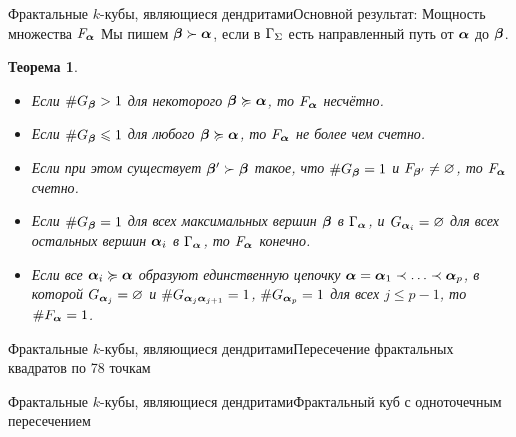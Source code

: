 \documentclass[aspectratio=1610, 10pt, notheorems]{beamer}
\newtheorem{theorem}     {Теорема}
\newtheorem{lemma}       {Лемма}
\begin{document}
\begin{frame}{Фрактальные $k$-кубы, являющиеся дендритами}{Основной результат: Мощность множества $F_{\bm{\alpha}}$}
Мы пишем ${\bm{\beta}}\succ{\bm{\alpha}}$, если в $\Gamma_\Sigma$ есть направленный путь от ${\bm{\alpha}}$ до ${\bm{\beta}}$.
\begin{theorem}
\begin{itemize} %
\item[(1)] Если $\#G_{\bm{\beta}}>1$ для некоторого ${\bm{\beta}}\succcurlyeq{\bm{\alpha}}$, то  $F_{\bm{\alpha}}$ несчётно.

\item[(2a)] Если  $\#G_{\bm{\beta}}\leqslant1$ для любого ${\bm{\beta}}\succcurlyeq{\bm{\alpha}}$, то  $F_{\bm{\alpha}}$ не более чем счетно.

\item[(2b)] Если при этом существует ${\bm{\beta}}'\succ{\bm{\beta}}$ такое, что $\#G_{\bm{\beta}}=1$ и $F_{{\bm{\beta}}'}\neq\varnothing$, то $F_{\bm{\alpha}}$ счетно.

\item[(3)] Если  $\#G_{\bm{\beta}}=1$ для всех максимальных вершин ${\bm{\beta}}$ в $\Gamma_{\bm{\alpha}}$, и $G_{{\bm{\alpha}}_i}=\varnothing$ для всех остальных вершин ${\bm{\alpha}}_i$ в $\Gamma_{\bm{\alpha}}$, то $F_{\bm{\alpha}}$ конечно.

\item[(4)] Если все ${\bm{\alpha}}_i\succcurlyeq{\bm{\alpha}}$ образуют единственную цепочку ${\bm{\alpha}}={\bm{\alpha}}_1\prec\ldots\prec{\bm{\alpha}}_p$, в которой $G_{{\bm{\alpha}}_j}=\varnothing$ и $\# G_{{\bm{\alpha}}_j{\bm{\alpha}}_{j+1}}=1$, $\#G_{{\bm{\alpha}}_p}=1$ для всех $j\le p-1$, то $\#F_{\bm{\alpha}}=1$.
\end{itemize}
\end{theorem}
\end{frame}


\begin{frame}{Фрактальные $k$-кубы, являющиеся дендритами}{Пересечение фрактальных квадратов по 78 точкам}
\end{frame}


\begin{frame}{Фрактальные $k$-кубы, являющиеся дендритами}{Фрактальный куб с одноточечным пересечением}
\end{frame}
\end{document}
